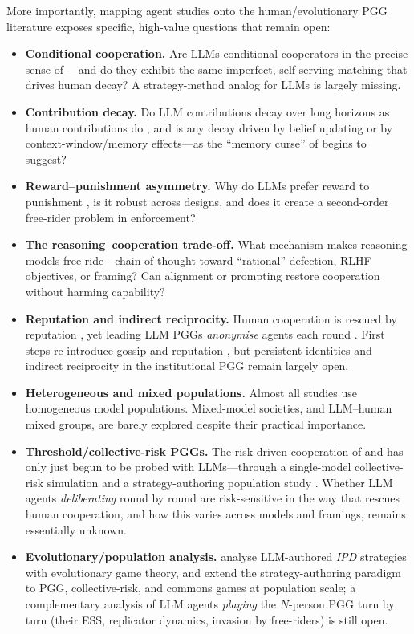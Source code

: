 \documentclass[11pt,a4paper]{article}
\begin{document}
More importantly, mapping agent studies onto the human/evolutionary PGG
literature exposes specific, high-value questions that remain open:
\begin{itemize}
  \item \textbf{Conditional cooperation.} Are LLMs conditional cooperators in the
  precise sense of \citet{fischbacher2001conditional}---and do they exhibit the
  same imperfect, self-serving matching that drives human decay? A strategy-method
  analog for LLMs is largely missing.
  \item \textbf{Contribution decay.} Do LLM contributions decay over long
  horizons as human contributions do \citep{isaac1988groupsize,fischbacher2010social},
  and is any decay driven by belief updating or by context-window/memory
  effects---as the ``memory curse'' of \citet{liu2026memory} begins to suggest?
  \item \textbf{Reward--punishment asymmetry.} Why do LLMs prefer reward to
  punishment \citep{guzman2025corrupted}, is it robust across designs, and does it
  create a second-order free-rider problem in enforcement?
  \item \textbf{The reasoning--cooperation trade-off.} What mechanism makes
  reasoning models free-ride---chain-of-thought toward ``rational'' defection,
  RLHF objectives, or framing? Can alignment or prompting restore cooperation
  without harming capability?
  \item \textbf{Reputation and indirect reciprocity.} Human cooperation is
  rescued by reputation \citep{milinski2002reputation,rockenbach2006efficient},
  yet leading LLM PGGs \emph{anonymise} agents each round
  \citep{guzman2025corrupted}. First steps re-introduce gossip and reputation
  \citep{cross2025validating,zhu2026gossip}, but persistent identities and indirect
  reciprocity in the institutional PGG remain largely open.
  \item \textbf{Heterogeneous and mixed populations.} Almost all studies use
  homogeneous model populations. Mixed-model societies, and LLM--human mixed
  groups, are barely explored despite their practical importance.
  \item \textbf{Threshold/collective-risk PGGs.} The risk-driven cooperation of
  \citet{milinski2008collective} and \citet{santos2011risk} has only just begun to
  be probed with LLMs---through a single-model collective-risk simulation
  \citep{slumbers2025port} and a strategy-authoring population study
  \citep{willis2026hundreds}. Whether LLM agents \emph{deliberating} round by round
  are risk-sensitive in the way that rescues human cooperation, and how this varies
  across models and framings, remains essentially unknown.
  \item \textbf{Evolutionary/population analysis.} \citet{willis2025cooperate}
  analyse LLM-authored \emph{IPD} strategies with evolutionary game theory, and
  \citet{willis2026hundreds} extend the strategy-authoring paradigm to PGG,
  collective-risk, and commons games at population scale; a complementary analysis
  of LLM agents \emph{playing} the $N$-person PGG turn by turn (their ESS,
  replicator dynamics, invasion by free-riders) is still open.
\end{itemize}
\end{document}

